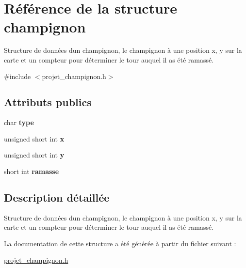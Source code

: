 \hypertarget{structchampignon}{}\section{Référence de la structure champignon}
\label{structchampignon}


Structure de données d\textquotesingle{}un champignon, le champignon à une position x, y sur la carte et un compteur pour déterminer le tour auquel il as été ramassé.  




{\ttfamily \#include $<$projet\+\_\+champignon.\+h$>$}

\subsection*{Attributs publics}
\begin{DoxyCompactItemize}
\item 
\hypertarget{structchampignon_aed63571ad4e8a8fb84e27398c7654189}{}\label{structchampignon_aed63571ad4e8a8fb84e27398c7654189} 
char {\bfseries type}
\item 
\hypertarget{structchampignon_a15e2bb287d684fb03593abd2fceeed5c}{}\label{structchampignon_a15e2bb287d684fb03593abd2fceeed5c} 
unsigned short int {\bfseries x}
\item 
\hypertarget{structchampignon_aadcfea12239a8c6d37e219afd5192b0f}{}\label{structchampignon_aadcfea12239a8c6d37e219afd5192b0f} 
unsigned short int {\bfseries y}
\item 
\hypertarget{structchampignon_a3d38015141b0012ce9ff81e92bfc3a12}{}\label{structchampignon_a3d38015141b0012ce9ff81e92bfc3a12} 
short int {\bfseries ramasse}
\end{DoxyCompactItemize}


\subsection{Description détaillée}
Structure de données d\textquotesingle{}un champignon, le champignon à une position x, y sur la carte et un compteur pour déterminer le tour auquel il as été ramassé. 

La documentation de cette structure a été générée à partir du fichier suivant \+:\begin{DoxyCompactItemize}
\item 
\hyperlink{projet__champignon_8h}{projet\+\_\+champignon.\+h}\end{DoxyCompactItemize}
